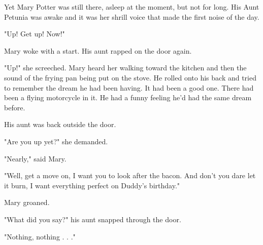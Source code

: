 Yet Mary Potter was still there, asleep at the moment, but not for long. His Aunt Petunia was awake and it was her shrill voice that made the first noise of the day. 

"Up! Get up! Now!" 

Mary woke with a start. His aunt rapped on the door again. 

"Up!" she screeched. Mary heard her walking toward the kitchen and then the sound of the frying pan being put on the stove. He rolled onto his back and tried to remember the dream he had been having. It had been a good one. There had been a flying motorcycle in it. He had a funny feeling he'd had the same dream before. 

His aunt was back outside the door. 

"Are you up yet?" she demanded. 

"Nearly," said Mary. 

"Well, get a move on, I want you to look after the bacon. And don't you dare let it burn, I want everything perfect on Duddy's birthday." 

Mary groaned. 

"What did you say?" his aunt snapped through the door. 

"Nothing, nothing . . ." 
